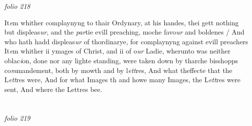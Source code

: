\documentclass[12pt, a4paper]{book}
\begin{document}
\textit{folio 218}


It\textit{e}m whither complaynyng to thair Ordynary, at his  handes, thei gett nothing but displeas\textit{ur}, and the \textit{par}tie evill preaching, moche favo\textit{ur} and boldenes / And who hath hadd displeas\textit{ur} of thordinarye, for complaynyng against evill preachers It\textit{e}m whither ii ymages of Christ, and ii of o\textit{ur} Ladie, wherunto was neither oblac\textit{i}on, done nor any lighte standing, were taken down by tharche bisshopps co\textit{m}mandement, both by mowth and by l\textit{ett}res, And what theffecte that the L\textit{ett}res were, And for what Images th and howe many Images, the L\textit{ett}res were sent, And  where the Lettres bee. 
               
\dotfill
					  \section*{}  \subsection*{}

\textit{folio 219}
\end{document}
